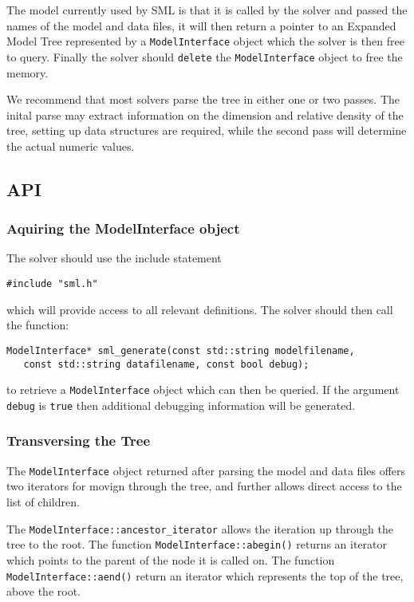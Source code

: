 \documentclass[10pt,a4paper]{book}
\begin{document}
The model currently used by SML is that it is called by the solver and passed
the names of the model and data files, it will then return a pointer to an
Expanded Model Tree represented by a {\tt ModelInterface} object which the
solver is then free to query. Finally the solver should {\tt delete} the
{\tt ModelInterface} object to free the memory.

We recommend that most solvers parse the tree in either one or two passes. The
inital parse may extract information on the dimension and relative density of
the tree, setting up data structures are required, while the second pass will
determine the actual numeric values.

\subsection{API}

\subsubsection{Aquiring the ModelInterface object}
The solver should use the include statement
\begin{verbatim}
#include "sml.h"
\end{verbatim}
which will provide access to all relevant definitions. The solver should then
call the function:

\begin{verbatim}
ModelInterface* sml_generate(const std::string modelfilename, 
   const std::string datafilename, const bool debug);
\end{verbatim}

to retrieve a {\tt ModelInterface} object which can then be queried. If the
argument {\tt debug} is {\tt true} then additional debugging information will
be generated.

\subsubsection{Transversing the Tree}
The {\tt ModelInterface} object returned after parsing the model and data files
offers two iterators for movign through the tree, and further allows direct
access to the list of children.

The {\tt ModelInterface::ancestor\_iterator} allows the iteration up through
the tree to the root. The function {\tt ModelInterface::abegin()} returns an
iterator which points to the parent of the node it is called on. The function
{\tt ModelInterface::aend()} return an iterator which represents the top of the
tree, above the root.
\end{document}
